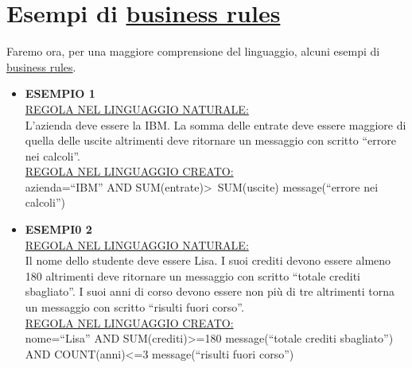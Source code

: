 \section{Esempi di \underline{business rules}}
Faremo ora, per una maggiore comprensione del linguaggio, alcuni esempi di \underline{business rules}.
\begin{itemize}
\item \textbf{ESEMPIO 1} \\
\underline{REGOLA NEL LINGUAGGIO NATURALE:} \\
L'azienda deve essere la IBM. La somma delle entrate deve essere maggiore di quella delle uscite altrimenti deve ritornare un messaggio con scritto ``errore nei calcoli''. \\
\underline{REGOLA NEL LINGUAGGIO CREATO:} \\
azienda=``IBM'' AND SUM(entrate)\textgreater\ SUM(uscite) message(``errore nei calcoli'')
\item \textbf{ESEMPI0 2} \\
\underline{REGOLA NEL LINGUAGGIO NATURALE:} \\
Il nome dello studente deve essere Lisa. I suoi crediti devono essere almeno 180 altrimenti deve ritornare un messaggio con scritto ``totale crediti sbagliato''. I suoi anni di corso devono essere non pi\`u di tre altrimenti torna un messaggio con scritto ``risulti fuori corso''.  \\
\underline{REGOLA NEL LINGUAGGIO CREATO:} \\
nome=``Lisa'' AND SUM(crediti)\textgreater =180 message(``totale crediti sbagliato'') AND COUNT(anni)\textless =3 message(``risulti fuori corso'')
\end{itemize}
